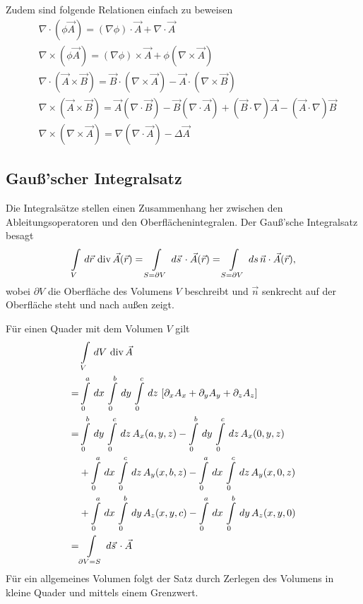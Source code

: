 Zudem sind folgende Relationen einfach zu beweisen
\begin{align*}
&\nabla\cdot(\phi\vec{A}) = (\nabla\phi)\cdot\vec{A} + \nabla\cdot\vec{A}\\
&\nabla\times(\phi\vec{A}) = (\nabla\phi)\times\vec{A} +
\phi(\nabla\times\vec{A})\\
&\nabla\cdot(\vec{A}\times\vec{B}) = \vec{B}\cdot(\nabla\times\vec{A}) -
\vec{A}\cdot(\nabla\times\vec{B})\\
&\nabla\times(\vec{A}\times\vec{B}) = \vec{A}(\nabla\cdot\vec{B}) -
\vec{B}(\nabla\cdot\vec{A}) + (\vec{B}\cdot\nabla)\vec{A} -
(\vec{A}\cdot\nabla)\vec{B}\\
&\nabla\times(\nabla\times\vec{A}) = \nabla(\nabla\cdot\vec{A}) - \Delta\vec{A}
\end{align*}

\subsection{Gauß'scher Integralsatz}
Die Integralsätze stellen einen Zusammenhang her zwischen den
Ableitungsoperatoren und den Oberflächenintegralen. Der Gauß'sche Integralsatz
besagt
\begin{align*}
\int \limits_{V} \,d\vec{r}\, \operatorname{div} \vec{A}(\vec{r}) = \int \limits_{S=\partial V} \,d\vec{s}\, \cdot
\vec{A}(\vec{r}) = \int \limits_{S = \partial V} \,ds\,
\vec{n}\cdot\vec{A}(\vec{r}),
\end{align*}
wobei $\partial V$ die Oberfläche des Volumens $V$ beschreibt und $\vec{n}$
senkrecht auf der Oberfläche steht und nach außen zeigt.
\par
\begin{info}
Für einen Quader mit dem Volumen $V$ gilt
\begin{align*}
&\int \limits_{V} \,dV\, \operatorname{div} \vec{A} \\
=&\int
\limits_{0}^{a}\,dx\,\int\limits_{0}^{b}\,dy\,\int\limits_{0}^{c}\,dz\,
\left[\partial_xA_x + \partial_yA_y + \partial_zA_z\right]\\
=&\int\limits_{0}^{b}\,dy\,\int\limits_{0}^{c}\,dz\, A_x(a,y,z) -
\int\limits_{0}^{b}\,dy\,\int\limits_{0}^{c}\,dz\, A_x(0,y,z) \\&+
\int\limits_{0}^{a}\,dx\,\int\limits_{0}^{c}\,dz\, A_y(x,b,z) -
\int\limits_{0}^{a}\,dx\,\int\limits_{0}^{c}\,dz\, A_y(x,0,z) \\&+
\int\limits_{0}^{a}\,dx\,\int\limits_{0}^{b}\,dy\, A_z(x,y,c) - 
\int\limits_{0}^{a}\,dx\,\int\limits_{0}^{b}\,dy\, A_z(x,y,0) \\=& \int
\limits_{\partial V = S} \,d\vec{s}\, \cdot\vec{A}
\end{align*}
Für ein allgemeines Volumen folgt der Satz durch Zerlegen des Volumens in
kleine Quader und mittels einem Grenzwert.
\end{info}

